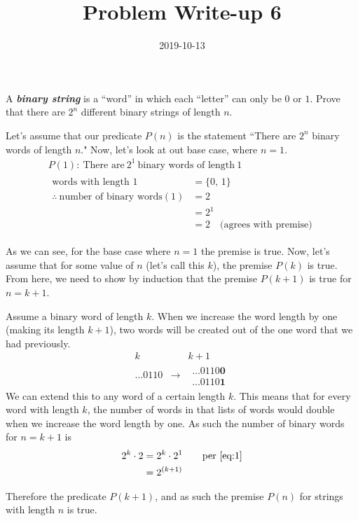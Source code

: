 \documentclass[a4paper,12pt]{article}
\title{Problem Write-up 6}
\date{2019-10-13}
\begin{document}
    \begin{problem}
        A \textbf{\textit{binary string}} is a “word” in which each “letter” can only be \(0\) or \(1\). Prove that there are \(2^n\) different binary strings of length \(n\).
    \end{problem}
    \begin{answer}
        Let's assume that our predicate \(P(n)\) is the statement ``There are \(2^n\) binary words of length \(n\)." Now, let's look at out base case, where \(n = 1\).
        \begin{gather}
            \nonumber P(1): \ \text{There are} \ 2^1 \ \text{binary words of length} \ 1 \\
            \begin{split} \label{eq:1}
                \text{words with length 1} &= \{0, \, 1\} \\
                \therefore \ \text{number of binary words}(1) &= 2 \\
                &= 2^1 \\
                &= 2  \quad \text{(agrees with premise)}
            \end{split}
        \end{gather}

        As we can see, for the base case where \(n = 1\) the premise is true. Now, let's assume that for some value of \(n\) (let's call this \(k\)), the premise \(P(k)\) is true. From here, we need to show by induction that the premise \(P(k + 1)\) is true for \(n = k + 1\). 

        Assume a binary word of length \(k\). When we increase the word length by one (making its length \(k + 1\)), two words will be created out of the one word that we had previously.
        \[
            \begin{array}{ccc}
                k & & k + 1 \\
                \ldots 0110 & \longrightarrow & \begin{aligned}
                    \ldots 0110\mathbf{0} \\
                    \ldots 0110\mathbf{1} 
                \end{aligned}
            \end{array}
        \]
        We can extend this to any word of a certain length \(k\). This means that for every word with length \(k\), the number of words in that lists of words would double when we increase the word length by one. As such the number of binary words for \(n = k + 1\) is
        \begin{align}
            \notag 2^k \cdot 2 &= 2^k \cdot 2^1 \qquad \text{per \eqref{eq:1}} \\
            &= 2^{(k +1)}
        \end{align}
        
        Therefore the predicate \(P(k + 1)\), and as such the premise \(P(n)\) for strings with length \(n\) is true.
    \end{answer}
\end{document}
